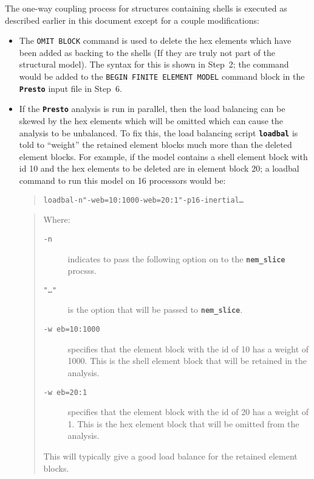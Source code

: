 \documentclass[11pt,twoside]{article}
\newcommand{\cmd}[1]
   {\mbox{\tt #1}\null}
\newcommand{\code}[1]
   {\mbox{\bf\tt #1}\null}
\newenvironment{source}
{\small\begin{quote}\begin{alltt}}
{\end{alltt}\end{quote}\normalsize}
\begin{document}
The one-way coupling process for structures containing shells is
executed as described earlier in this document except for a couple
modifications:
\begin{itemize}
\item The \cmd{OMIT BLOCK} command is used to delete the hex elements
which have been added as backing to the shells (If they are truly not
part of the structural model). The syntax for this is shown in
Step~2; the command would be added to the
\cmd{BEGIN FINITE ELEMENT MODEL} command block in the \code{Presto} input file in Step~6.
\item If the \code{Presto} analysis is run in parallel, then the load
balancing can be skewed by the hex elements which will be omitted
which can cause the analysis to be unbalanced.  To fix this, the load
balancing script \code{loadbal} is told to ``weight'' the retained
element blocks much more than the deleted element blocks. For example,
if the model contains a shell element block with id 10 and the hex
elements to be deleted are in element block 20; a loadbal command to
run this model on 16 processors would be:
\begin{source}
 loadbal -n "-w eb=10:1000 -w eb=20:1" -p 16 -inertial \ldots
\end{source}
\begin{quote}
Where:
\begin{description}
   \item[\cmd{-n}] indicates to pass the following option on to the \code{nem\_slice} procsss.
   \item[\cmd{"\ldots"}] is the option that will be passed to \code{nem\_slice}.
   \item[\cmd{-w eb=10:1000}] specifies that the element block with the id of
10 has a weight of 1000.  This is the shell element block that will be
retained in the analysis.
   \item[\cmd{-w eb=20:1}] specifies that the element block with the id of 20
has a weight of 1.  This is the hex element block that will be omitted
from the analysis.
\end{description}
This will typically give a good load balance for the retained element blocks.
\end{quote}
\end{itemize}
\end{document}
